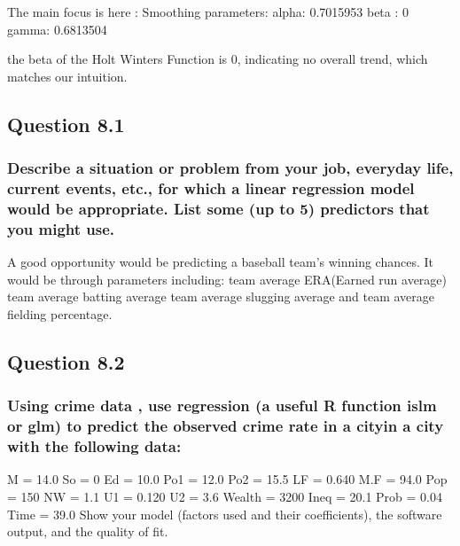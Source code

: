 \documentclass[
]{article}
\begin{document}
The main focus is here : Smoothing parameters: alpha: 0.7015953 beta : 0
gamma: 0.6813504

the beta of the Holt Winters Function is 0, indicating no overall trend,
which matches our intuition.

\hypertarget{question-8.1}{%
\subsection{Question 8.1}\label{question-8.1}}

\hypertarget{describe-a-situation-or-problem-from-your-job-everyday-life-current-events-etc.-for-which-a-linear-regression-model-would-be-appropriate.-list-some-up-to-5-predictors-that-you-might-use.}{%
\subsubsection{Describe a situation or problem from your job, everyday
life, current events, etc., for which a linear regression model would be
appropriate. List some (up to 5) predictors that you might
use.}\label{describe-a-situation-or-problem-from-your-job-everyday-life-current-events-etc.-for-which-a-linear-regression-model-would-be-appropriate.-list-some-up-to-5-predictors-that-you-might-use.}}

A good opportunity would be predicting a baseball team's winning
chances. It would be through parameters including: team average
ERA(Earned run average) team average batting average team average
slugging average and team average fielding percentage.

\hypertarget{question-8.2}{%
\subsection{Question 8.2}\label{question-8.2}}

\hypertarget{using-crime-data-use-regression-a-useful-r-function-islm-or-glm-to-predict-the-observed-crime-rate-in-a-cityin-a-city-with-the-following-data}{%
\subsubsection{Using crime data , use regression (a useful R function
islm or glm) to predict the observed crime rate in a cityin a city with
the following
data:}\label{using-crime-data-use-regression-a-useful-r-function-islm-or-glm-to-predict-the-observed-crime-rate-in-a-cityin-a-city-with-the-following-data}}

M = 14.0 So = 0 Ed = 10.0 Po1 = 12.0 Po2 = 15.5 LF = 0.640 M.F = 94.0
Pop = 150 NW = 1.1 U1 = 0.120 U2 = 3.6 Wealth = 3200 Ineq = 20.1 Prob =
0.04 Time = 39.0 Show your model (factors used and their coefficients),
the software output, and the quality of fit.
\end{document}
